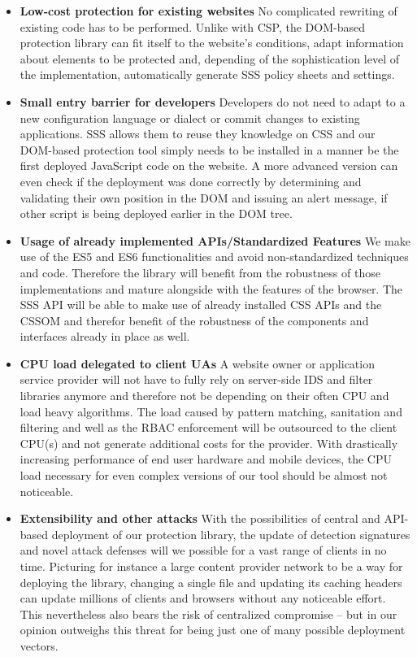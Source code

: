 \begin{itemize}
 \item \textbf{Low-cost protection for existing websites} No complicated rewriting of existing code has to be performed. Unlike with CSP, the DOM-based protection library can fit itself to the website's conditions, adapt information about elements to be protected and, depending of the sophistication level of the implementation, automatically generate SSS policy sheets and settings.
 \item \textbf{Small entry barrier for developers} Developers do not need to adapt to a new configuration language or dialect or commit changes to existing applications. SSS allows them to reuse they knowledge on CSS and our DOM-based protection tool simply needs to be installed in a manner be the first deployed JavaScript code on the website. A more advanced version can even check if the deployment was done correctly by determining and validating their own position in the DOM and issuing an alert message, if other script is being deployed earlier in the DOM tree.
 \item \textbf{Usage of already implemented APIs/Standardized Features} We make use of the ES5 and ES6 functionalities and avoid non-standardized techniques and code. Therefore the library will benefit from the robustness of those implementations and mature alongside with the features of the browser. The SSS API will be able to make use of already installed CSS APIs and the CSSOM and therefor benefit of the robustness of the components and interfaces already in place as well.
 \item \textbf{CPU load delegated to client UAs} A website owner or application service provider will not have to fully rely on server-side IDS and filter libraries anymore and therefore not be depending on their often CPU and load heavy algorithms. The load caused by pattern matching, sanitation and filtering and well as the RBAC enforcement will be outsourced to the client CPU(s) and not generate additional costs for the provider. With drastically increasing performance of end user hardware and mobile devices, the CPU load necessary for even complex versions of our tool should be almost not noticeable.
 \item \textbf{Extensibility and other attacks} With the possibilities of central and API-based deployment of our protection library, the update of detection signatures and novel attack defenses will we possible for a vast range of clients in no time. Picturing for instance a large content provider network to be a way for deploying the library, changing a single file and updating its caching headers can update millions of clients and browsers without any noticeable effort. This nevertheless also bears the risk of centralized compromise -- but in our opinion outweighs this threat for being just one of many possible deployment vectors.
\end{itemize}

